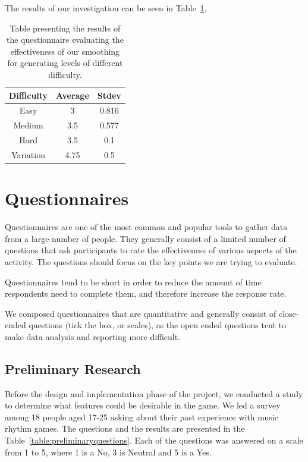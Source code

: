 The results of our investigation can be seen in Table~\ref{table:smoothing}. 

\begin{table}
\begin{center}
\begin{tabular}{| c | c | c | } 																								      \hline 
\textbf{Difficulty} & \textbf{Average} & \textbf{Stdev} \\ \hline \hline
Easy 				& 3 					   & 0.816  			   \\ \hline 
Medium 			& 3.5 			   	   & 0.577		 	   \\ \hline 
Hard					& 3.5 				   & 0.1  		 	   \\ \hline \hline
Variation			& 4.75				   & 0.5				   \\ \hline
\end{tabular}
\caption{Table presenting the results of the questionnaire evaluating the effectiveness of our smoothing for generating levels of different difficulty.}
\label{table:smoothing}
\end{center}
\end{table}


\vspace{20pt}

\section{Questionnaires}

Questionnaires are one of the most common and popular tools to gather data from a large number of people. They generally consist of a limited number of questions that ask participants to rate the effectiveness of various aspects of the activity. The questions should focus on the key points we are trying to evaluate. 

Questionnaires tend to be short in order to reduce the amount of time respondents need to complete them, and therefore increase the response rate. 

We composed questionnaires that are quantitative and generally consist of close-ended questions (tick the box, or scales), as the open ended questions tent to make data analysis and reporting more difficult.

\subsection*{Preliminary Research}

Before the design and implementation phase of the project, we conducted a study to determine what features could be desirable in the game. We led a survey among 18 people aged 17-25 asking about their past experience with music rhythm games. 
The questions and the results are presented in the Table~\ref{table:preliminaryquestions}. Each of the questions was answered on a scale from 1 to 5, where 1 is a No,  3 is Neutral and 5 is a Yes.

